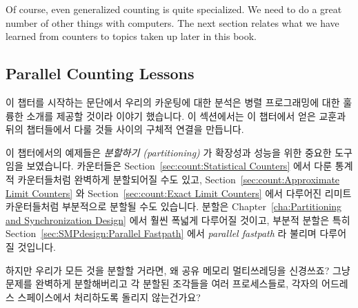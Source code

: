 \begin{lineref}
Of course, even generalized counting is quite specialized.
We need to do a great number of other things with computers.
The next section relates what we have learned from counters to
topics taken up later in this book.
\fi

\subsection{Parallel Counting Lessons}
\label{sec:count:Parallel Counting Lessons}

이 챕터를 시작하는 문단에서 우리의 카운팅에 대한 분석은 병렬 프로그래밍에 대한
훌륭한 소개를 제공할 것이라 이야기 했습니다.
이 섹션에서는 이 챕터에서 얻은 교훈과 뒤의 챕터들에서 다룰 것들 사이의 구체적
연결을 만듭니다.

이 챕터에서의 예제들은 \emph{분할하기 (partitioning)} 가 확장성과 성능을 위한
중요한 도구임을 보였습니다.
카운터들은 Section~\ref{sec:count:Statistical Counters} 에서 다룬 통계적
카운터들처럼 완벽하게 분할되어질 수도 있고,
Section~\ref{sec:count:Approximate Limit Counters} 와
Section~\ref{sec:count:Exact Limit Counters} 에서 다루어진
리미트 카운터들처럼 부분적으로 분할될 수도 있습니다.
분할은 Chapter~\ref{cha:Partitioning and Synchronization Design} 에서 훨씬
폭넓게 다루어질 것이고, 부분적 분할은 특히
Section~\ref{sec:SMPdesign:Parallel Fastpath} 에서 \emph{parallel fastpath} 라
불리며 다루어질 것입니다.

\QuickQuiz{}
	하지만 우리가 모든 것을 분할할 거라면, 왜 공유 메모리 멀티쓰레딩을
	신경쓰죠?
	그냥 문제를 완벽하게 분할해버리고 각 분할된 조각들을 여러 프로세스들로,
	각자의 어드레스 스페이스에서 처리하도록 돌리지 않는건가요?
	\iffalse


\end{lineref}
